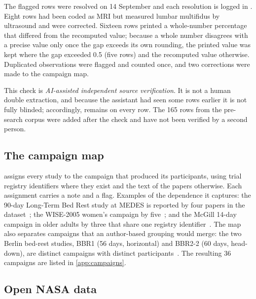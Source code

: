 The flagged rows were resolved on 14 September and each resolution is logged in .
Eight rows had been coded as MRI but measured lumbar multifidus by ultrasound and were corrected. Sixteen rows
printed a whole-number percentage that differed from the recomputed value; because a whole number disagrees with a
precise value only once the gap exceeds its own rounding, the printed value was kept where the gap exceeded
0.5\pp{} (five rows) and the recomputed value otherwise. Duplicated observations were flagged and counted once, and
two corrections were made to the campaign map.

This check is \emph{AI-assisted independent source verification}. It is not a human double extraction, and because
the assistant had seen some rows earlier it is not fully blinded; accordingly,  remains
 on every row. The 165 rows from the pre-search corpus were added after the check and have not been
verified by a second person.

\subsection{The campaign map}
\label{sec:cohort-map}

 assigns every study to the campaign that produced its participants, using trial registry
identifiers where they exist and the text of the papers otherwise. Each assignment carries a note and a
 flag. Examples of the dependence it captures: the 90-day Long-Term Bed Rest study at MEDES is
reported by four papers in the dataset~\citep{alkner2004,belavy2017,trappe2023,rittweger2013}; the WISE-2005
women's campaign by five~\citep{trappe2007,rogers2025,trappe2023,holt2015,holt2016}; and the McGill 14-day
campaign in older adults by three that share one registry
identifier~\citep{dulac2024,hajjboutros2023,lagace2026}. The map also separates campaigns that an author-based
grouping would merge: the two Berlin bed-rest studies, BBR1 (56 days, horizontal) and BBR2-2 (60 days, head-down),
are distinct campaigns with distinct participants~\citep{belavy2009,miokovic2012}. The resulting 36 campaigns are
listed in \cref{app:campaigns}.

\subsection{Open NASA data}
\label{sec:nasa}

